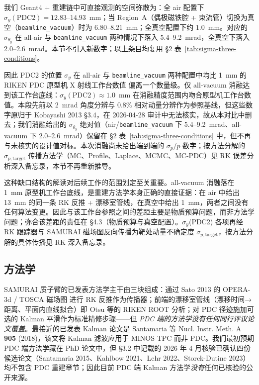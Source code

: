 \documentclass[a4paper, 11pt]{article}
\begin{document}
我们 Geant4 + 重建链中可直接观测的空间弥散为：全 air 配置下 $\sigma_y(\text{PDC2}) = 12.83$--$14.93$~mm；当 Region~A（偶极磁铁腔 + 束流管）切换为真空（\texttt{beamline\_vacuum}）时为 $6.80$--$8.21$~mm；全真空配置下约 $1.0$~mm。对应的 $\sigma_{\theta_y}$ 在 all-air 与 \texttt{beamline\_vacuum} 两种情况下落入 5.4--9.2~mrad，全真空下落入 2.0--2.6~mrad。本节不引入新数字；以上条目均复用 §2 表~\ref{tab:sigma-three-conditions}。

因此 PDC2 的位置 $\sigma_y$ 在 all-air 与 \texttt{beamline\_vacuum} 两种配置中均比 1~mm 的 RIKEN PDC 原型机 X 射线工作台数值 偏离一个数量级。仅 all-vacuum 消融达到该工作台底线：$\sigma_y(\text{PDC2}) \approx 1.0$~mm 在消融精度范围内吻合原型机工作台数值。本段先前以 2~mrad 角度分辨与 0.8\% 相对动量分辨作为参照基线，但这些数字原归于 Kobayashi 2013 §3.4，在 2026-04-28 审计中无法核实，故从本对比中删去；我们消融给出的 $\sigma_{\theta_y}$ 绝对值（air/\texttt{beamline\_vacuum} 下 5.4--9.2~mrad、all-vacuum 下 2.0--2.6~mrad）保留在 §2 表~\ref{tab:sigma-three-conditions} 中，但不再与未核实的设计值对标。本次消融尚未给出端到端的 $\sigma_p/p$ 数字；按方法分解的 $\sigma_{p,\text{target}}$ 传播方法学（MC、Profile、Laplace、MCMC、MC-PDC）见 RK 误差分析深入备忘录，本节不再重新推导。

这种缺口结构的解读对后续工作的范围划定至关重要。all-vacuum 消融落在 1~mm 原型机工作台底线，是重建方法学本身正确的直接证据：在 air 中给出 13~mm 的同一条 RK 反推 + 漂移室管线，在真空中给出 1~mm，两者之间没有任何算法变更。因此与该工作台参照之间的差距主要是物质预算问题，而非方法学问题；弥合该差距的责任在 §4.3（物质预算与真空配置）。$\sigma_y$(PDC2) 各项再经 RK 跟踪器与 SAMURAI 磁场图反向传播为靶处动量不确定度 $\sigma_{p,\text{target}}$，按方法分解的具体传播见 RK 深入备忘录。

\subsection{方法学}
SAMURAI 质子臂的已发表方法学主干由三块组成：通过 Sato 2013 的 OPERA-3d / TOSCA 磁场图 进行 RK 反推作为传播器；前端的漂移室管线（漂移时间→距离、平面内直线拟合）即 Otsu 等的 RIKEN ROOT 分析；对 PDC 径迹施加可选的 Kalman 平滑作为标准精修步骤——但 \emph{PDC 端的方法学没有任何同行评议论文覆盖}。最接近的已发表 Kalman 论文是 Santamaria 等 Nucl. Instr. Meth. A \textbf{905} (2018)，该文将 Kalman 滤波应用于 MINOS TPC 而非 PDC。我们最初预期 PDC 端方法学藏在 PhD 论文中，但 §3.2 中记载的 2026 年 4 月核验已确认四份候选论文（Santamaria 2015、Kahlbow 2021、Lehr 2022、Storck-Dutine 2023）均不包含 PDC 重建章节；因此目前 PDC 端 Kalman 方法学\emph{没有}任何已核验的公开来源。
\end{document}
